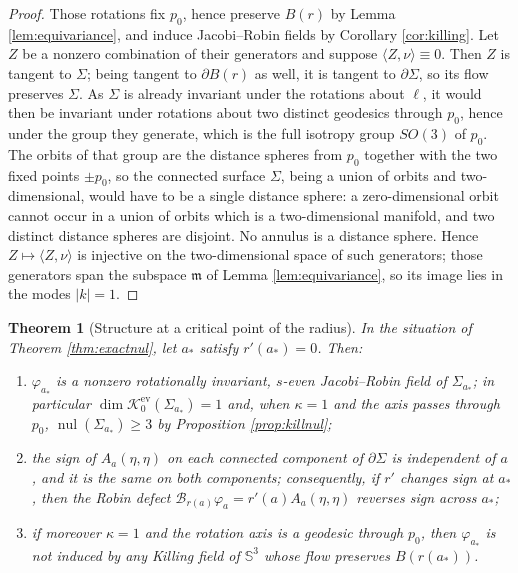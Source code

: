 \documentclass[11pt,a4paper]{amsart}
\theoremstyle{plain}
\newtheorem{theorem}{Theorem}[section]
\theoremstyle{definition}
\newcommand{\Sph}{\mathbb{S}}
\newcommand{\nul}{\operatorname{nul}}
\newcommand{\Ker}{\mathcal{K}}
\begin{document}
\begin{proof}
Those rotations fix $p_0$, hence preserve $B(r)$ by Lemma \ref{lem:equivariance}, and induce Jacobi--Robin fields by Corollary \ref{cor:killing}. Let $Z$ be a nonzero combination of their generators and suppose $\langle Z,\nu\rangle\equiv 0$. Then $Z$ is tangent to $\Sigma$; being tangent to $\partial B(r)$ as well, it is tangent to $\partial\Sigma$, so its flow preserves $\Sigma$. As $\Sigma$ is already invariant under the rotations about $\ell$, it would then be invariant under rotations about two distinct geodesics through $p_0$, hence under the group they generate, which is the full isotropy group $SO(3)$ of $p_0$. The orbits of that group are the distance spheres from $p_0$ together with the two fixed points $\pm p_0$, so the connected surface $\Sigma$, being a union of orbits and two-dimensional, would have to be a single distance sphere: a zero-dimensional orbit cannot occur in a union of orbits which is a two-dimensional manifold, and two distinct distance spheres are disjoint. No annulus is a distance sphere. Hence $Z\mapsto\langle Z,\nu\rangle$ is injective on the two-dimensional space of such generators; those generators span the subspace $\mathfrak{m}$ of Lemma \ref{lem:equivariance}, so its image lies in the modes $|k|=1$.
\end{proof}

\begin{theorem}[Structure at a critical point of the radius]\label{thm:fold}
In the situation of Theorem \ref{thm:exactnul}, let $a_*$ satisfy $r'(a_*)=0$. Then:
\begin{enumerate}
\item[\textup{(i)}] $\varphi_{a_*}$ is a nonzero rotationally invariant, $s$-even Jacobi--Robin field of $\Sigma_{a_*}$; in particular $\dim\Ker_0^{\mathrm{ev}}(\Sigma_{a_*})=1$ and, when $\kappa=1$ and the axis passes through $p_0$, $\nul(\Sigma_{a_*})\geq 3$ by Proposition \ref{prop:killnul};
\item[\textup{(ii)}] the sign of $A_a(\eta,\eta)$ on each connected component of $\partial\Sigma$ is independent of $a$, and it is the same on both components; consequently, if $r'$ changes sign at $a_*$, then the Robin defect $\mathcal{B}_{r(a)}\varphi_a=r'(a)A_a(\eta,\eta)$ reverses sign across $a_*$;
\item[\textup{(iii)}] if moreover $\kappa=1$ and the rotation axis is a geodesic through $p_0$, then $\varphi_{a_*}$ is not induced by any Killing field of $\Sph^3$ whose flow preserves $B(r(a_*))$.
\end{enumerate}
\end{theorem}
\end{document}
